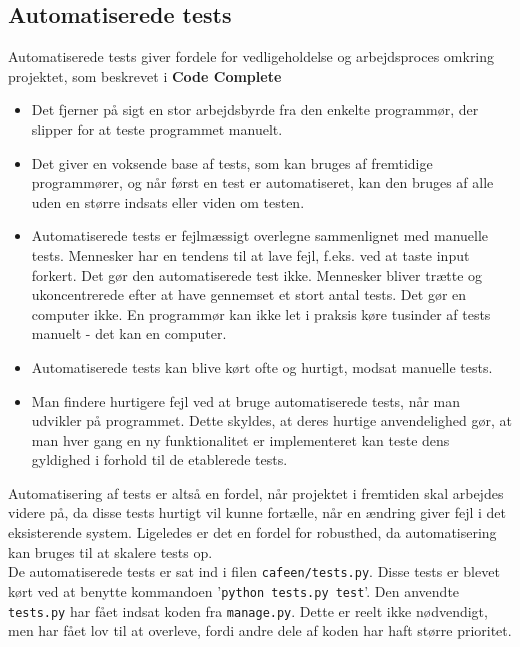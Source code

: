 \documentclass[]{article}
\begin{document}
\subsection{Automatiserede tests} \label{AutomatiseredeTests}
Automatiserede tests giver fordele for vedligeholdelse og arbejdsproces omkring projektet, som beskrevet i \textbf{Code Complete} \cite{mcconnell2004code}
\begin{itemize}
	\item Det fjerner på sigt en stor arbejdsbyrde fra den enkelte programmør, der slipper for at teste programmet manuelt.
	\item Det giver en voksende base af tests, som kan bruges af fremtidige programmører, og når først en test er automatiseret, kan den bruges af alle uden en større indsats eller viden om testen.
	\item Automatiserede tests er fejlmæssigt overlegne sammenlignet med manuelle tests. Mennesker har en tendens til at lave fejl, f.eks. ved at taste input forkert. Det gør den automatiserede test ikke. Mennesker bliver trætte og ukoncentrerede efter at have gennemset et stort antal tests. Det gør en computer ikke. En programmør kan ikke let i praksis køre tusinder af tests manuelt - det kan en computer.
	\item Automatiserede tests kan blive kørt ofte og hurtigt, modsat manuelle tests.
	\item Man findere hurtigere fejl ved at bruge automatiserede tests, når man udvikler på programmet. Dette skyldes, at deres hurtige anvendelighed gør, at man hver gang en ny funktionalitet er implementeret kan teste dens gyldighed i forhold til de etablerede tests.
\end{itemize}
Automatisering af tests er altså en fordel, når projektet i fremtiden skal arbejdes videre på, da disse tests hurtigt vil kunne fortælle, når en ændring giver fejl i det eksisterende system. Ligeledes er det en fordel for robusthed, da automatisering kan bruges til at skalere tests op. \\
\indent De automatiserede tests er sat ind i filen \texttt{cafeen/tests.py}. Disse tests er blevet kørt ved at benytte kommandoen '\texttt{python tests.py test}'. Den anvendte \texttt{tests.py} har fået indsat koden fra \texttt{manage.py}. Dette er reelt ikke nødvendigt, men har fået lov til at overleve, fordi andre dele af koden har haft større prioritet. \\
\end{document}

